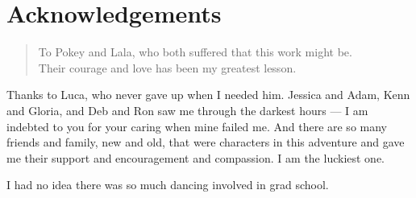 \chapter{Acknowledgements}

\begin{quote}
To Pokey and Lala,
who both suffered that this work might be.\\
Their courage and love has been my greatest lesson.
\end{quote}


Thanks to Luca, who never gave up when I needed him.
Jessica and Adam, Kenn and Gloria, and Deb and Ron
saw me through the darkest hours --- I am indebted to you
for your caring when mine failed me.
And there are so many friends and family, new and old,
that were characters in this adventure and gave me their
support and encouragement and compassion.
I am the luckiest one.

I had no idea there was so much dancing involved in grad school.

